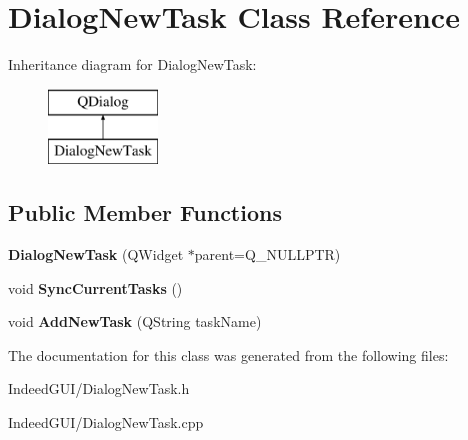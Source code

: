 \hypertarget{class_dialog_new_task}{}\section{Dialog\+New\+Task Class Reference}
\label{class_dialog_new_task}
Inheritance diagram for Dialog\+New\+Task\+:\begin{figure}[H]
\begin{center}
\leavevmode
\includegraphics[height=2.000000cm]{class_dialog_new_task}
\end{center}
\end{figure}
\subsection*{Public Member Functions}
\begin{DoxyCompactItemize}
\item 
\hypertarget{class_dialog_new_task_a657a4f4fa065e43c8dc4c28d774b105c}{}{\bfseries Dialog\+New\+Task} (Q\+Widget $\ast$parent=Q\+\_\+\+N\+U\+L\+L\+P\+T\+R)\label{class_dialog_new_task_a657a4f4fa065e43c8dc4c28d774b105c}

\item 
\hypertarget{class_dialog_new_task_a6422158334a55dcdddf6b6e50c580a73}{}void {\bfseries Sync\+Current\+Tasks} ()\label{class_dialog_new_task_a6422158334a55dcdddf6b6e50c580a73}

\item 
\hypertarget{class_dialog_new_task_a5d9741b09eecbc94f1b2bf178431504a}{}void {\bfseries Add\+New\+Task} (Q\+String task\+Name)\label{class_dialog_new_task_a5d9741b09eecbc94f1b2bf178431504a}

\end{DoxyCompactItemize}


The documentation for this class was generated from the following files\+:\begin{DoxyCompactItemize}
\item 
Indeed\+G\+U\+I/Dialog\+New\+Task.\+h\item 
Indeed\+G\+U\+I/Dialog\+New\+Task.\+cpp\end{DoxyCompactItemize}
